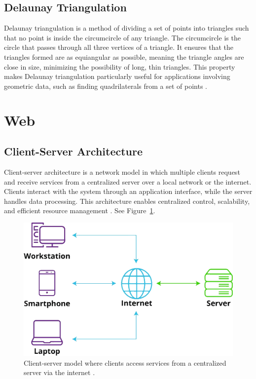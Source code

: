 \subsection*{Delaunay Triangulation}
\label{subsec:delaunay-triangulation}

Delaunay triangulation is a method of dividing a set of points into triangles such that no point is inside the circumcircle of any triangle. The circumcircle is the circle that passes through all three vertices of a triangle. It ensures that the triangles formed are as equiangular as possible,  meaning the triangle angles are close in size, minimizing the possibility of long, thin triangles. This property makes Delaunay triangulation particularly useful for applications involving geometric data, such as finding quadrilaterals from a set of points \cite{ianthehenry:delaunay}.

\section{Web}
\label{sec:web}

\subsection*{Client-Server Architecture}
\label{subsec:client-server}

Client-server architecture is a network model in which multiple clients request and receive services from a centralized server over a local network or the internet. Clients interact with the system through an application interface, while the server handles data processing. This architecture enables centralized control, scalability, and efficient resource management \cite{liquidweb:client-server}. See Figure~\ref{fig:client-server-architecture}.


\begin{figure}[h!]
    \centering
    \includegraphics[width=0.75\linewidth]{figures/theory/client-server-architecture.png}
    \caption[Client-server architecture]{Client-server model where clients access services from a centralized server via the internet \cite{liquidweb:client-server}.}
    \label{fig:client-server-architecture}
\end{figure}

